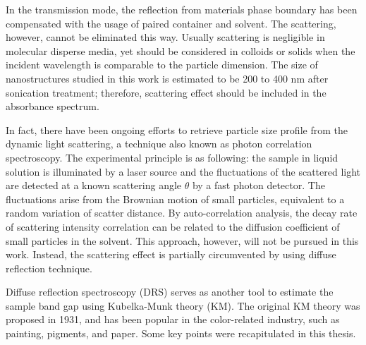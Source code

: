 In the transmission mode, the reflection from materials phase boundary has been compensated with the usage of paired container and solvent. The scattering, however, cannot be eliminated this way. Usually scattering is negligible in molecular disperse media, yet should be considered in colloids or solids when the incident wavelength is comparable to the particle dimension. The size of nanostructures studied in this work is estimated to be 200 to 400 nm after sonication treatment; therefore, scattering effect should be included in the absorbance spectrum. 

In fact, there have been ongoing efforts to retrieve particle size profile from the dynamic light scattering, a technique also known as photon correlation spectroscopy. The experimental principle is as following: the sample in liquid solution is illuminated by a laser source and the fluctuations of the scattered light are detected at a known scattering angle $\theta$ by a fast photon detector. The fluctuations arise from the Brownian motion of small particles, equivalent to a random variation of scatter distance. By auto-correlation analysis, the decay rate of scattering intensity correlation can be related to the diffusion coefficient of small particles in the solvent.\cite{Maret1987} This approach, however, will not be pursued in this work. Instead, the scattering effect is partially circumvented by using diffuse reflection technique. 

Diffuse reflection spectroscopy (DRS) serves as another tool to estimate the sample band gap using Kubelka-Munk theory (KM).\cite{Tandon1970} The original KM theory was proposed in 1931,\cite{Kubelka1931} and has been popular in the color-related industry, such as painting, pigments, and paper. Some key points were recapitulated in this thesis.

